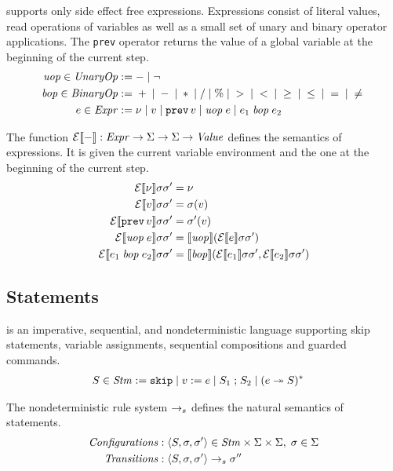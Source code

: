 \documentclass[a4paper,10pt,english]{article}
\begin{document}
\Fil supports only side effect free expressions. Expressions consist of literal values, read operations of variables as
well as a small set of unary and binary operator applications. The \texttt{prev} operator returns the value of a global
variable at the beginning of the current step.
\begin{align*}
	\mathit{uop} \in \mathit{UnaryOp} & := - \mid \neg
	\\
    \mathit{bop} \in \mathit{BinaryOp} & := {} + {} \mid {} - {} \mid {} \ast {} \mid {} / {}
                       \mid {} \% {} \mid {} > {} \mid {} < {} \mid {} \geq {} 
                       \mid {} \leq {} \mid {} = {} \mid {} \neq {}
	\\
	e \in \mathit{Expr} & := 
		\nu \mid
		v \mid
		\mathtt{prev} \,v \mid
		\mathit{uop}\; e \mid
		e_1 \;\mathit{bop}\; e_2
\end{align*}

The function $\mathcal{E} \llbracket - \rrbracket : \mathit{Expr} \rightarrow \Sigma \rightarrow \Sigma \rightarrow \mathit{Value}$ defines the semantics of
expressions. It is given the current variable environment and the one at the beginning of the current step.
\begin{align*}
	\mathcal{E} \llbracket \nu \rrbracket \sigma \sigma' &= \nu \\
	\mathcal{E} \llbracket v \rrbracket \sigma \sigma' &= \sigma(v) \\
	\mathcal{E} \llbracket \mathtt{prev} \,v \rrbracket \sigma \sigma' &= \sigma'(v) \\
	\mathcal{E} \llbracket \mathit{uop}\; e \rrbracket \sigma \sigma' &= \llbracket \mathit{uop} \rrbracket (\mathcal{E} \llbracket e \rrbracket \sigma \sigma') \\
	\mathcal{E} \llbracket e_1 \;\mathit{bop}\; e_2 \rrbracket \sigma \sigma' &= \llbracket \mathit{bop} \rrbracket (\mathcal{E} \llbracket e_1 \rrbracket \sigma
	\sigma', \mathcal{E} \llbracket e_2 \rrbracket \sigma	\sigma')
\end{align*}

\subsection{Statements}

\Fil is an imperative, sequential, and nondeterministic language supporting skip statements, variable assignments, sequential
compositions and guarded commands.
\begin{align*}
	S \in \mathit{Stm} & :=
		\mathtt{skip} \mid 
		v\; \mathtt{:=}\; e \mid 
		S_1 \; \mathtt{;} \; S_2 \mid
		(e \; \mathtt{\twoheadrightarrow} \; S)^*
\end{align*}

The nondeterministic rule system $\rightarrow_s$ defines the natural semantics of statements.
\begin{align*}
	\mathit{Configurations} : & \;\langle S, \sigma, \sigma' \rangle \in \mathit{Stm} \times \Sigma \times \Sigma, \; 
	\sigma \in \Sigma
	\\
	\mathit{Transitions} : & \;\langle S, \sigma, \sigma' \rangle \rightarrow_s \sigma''
\end{align*}
\end{document}
